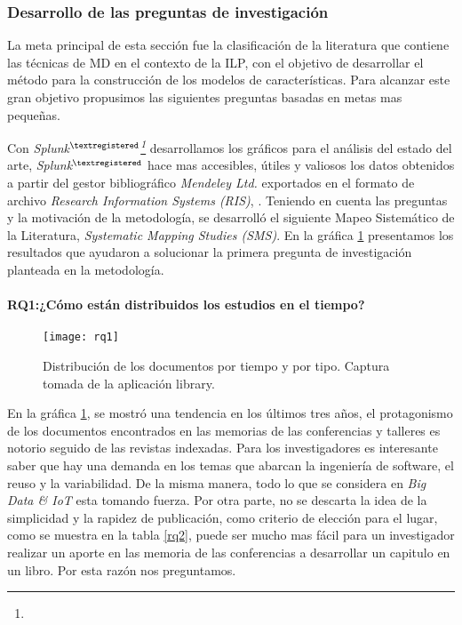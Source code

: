\subsubsection{Desarrollo de las preguntas de investigación}

La meta principal de esta sección fue la clasificación de la literatura que contiene las técnicas de MD en el contexto de la ILP, con el objetivo de desarrollar el método para la construcción de los modelos de características. Para alcanzar este gran objetivo propusimos las siguientes preguntas basadas en metas mas pequeñas. 

Con \textit{Splunk$^{\textregistered}$\footnote{  }} desarrollamos los gráficos para el análisis del estado del arte, \textit{Splunk$^{\textregistered}$} hace mas accesibles, útiles y valiosos los datos obtenidos a partir del gestor bibliográfico \textit{Mendeley Ltd.}  exportados en el formato de archivo \textit{Research Information Systems (RIS)}, . Teniendo en cuenta las preguntas y la motivación de la metodología, se desarrolló el siguiente Mapeo Sistemático de  la Literatura, \textit{Systematic Mapping Studies (SMS)}. En la gráfica \ref{rq1} presentamos los resultados que ayudaron a solucionar la primera pregunta de investigación planteada en la metodología. 
\paragraph{RQ1:¿Cómo están distribuidos los estudios en el tiempo?}

\begin{figure}[h]
	\centering
	\texttt{[image: rq1]}
	\caption{Distribución de los documentos por tiempo y por tipo. Captura tomada de la aplicación library.}
	\label{rq1}
\end{figure}

En la gráfica \ref{rq1}, se mostró una tendencia en los últimos tres años, el protagonismo de los documentos encontrados en las memorias de las conferencias y talleres es notorio seguido de las revistas indexadas. Para los investigadores es interesante saber que hay una demanda en los temas que abarcan la ingeniería de software, el reuso y la variabilidad. De la misma manera, todo lo que se considera en \textit{Big Data \& IoT } esta tomando fuerza. Por otra parte, no se descarta la idea de la simplicidad y la rapidez de publicación, como criterio de elección para el lugar, como se muestra en la tabla \ref{rq2},  puede ser mucho mas fácil para un investigador realizar un aporte en las memoria de las conferencias a desarrollar un capitulo en un libro. Por esta razón nos preguntamos.

